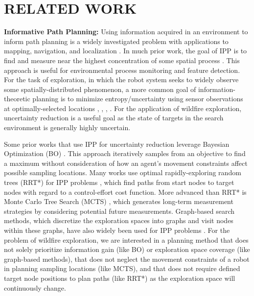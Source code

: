 \documentclass[letterpaper, 10 pt, conference]{ieeeconf}  %
\begin{document}
\section{RELATED WORK}
\noindent
\textbf{Informative Path Planning:}
Using information acquired in an environment to inform path planning is a widely investigated problem with applications to mapping, navigation, and localization \cite{bai2021information}. In much prior work, the goal of IPP is to find and measure near the highest concentration of some spatial process \cite{marchant2014sequential} \cite{blanchard2022informative} \cite{singh2009nonmyopic}. This approach is useful for environmental process monitoring and feature detection. 
For the task of exploration, in which the robot system seeks to widely observe some spatially-distributed phenomenon, a more common goal of information-theoretic planning is to minimize entropy/uncertainty using sensor observations at optimally-selected locations \cite{584097}, \cite{jiang2019maximum}, \cite{popovic2017online}, \cite{cao2013multi}. For the application of wildfire exploration, uncertainty reduction is a useful goal as the state of targets in the search environment is generally highly uncertain. 

Some prior works that use IPP for uncertainty reduction leverage Bayesian Optimization (BO) \cite{marchant2014sequential} \cite{bai2016information}. This approach iteratively samples from an objective to find a maximum without consideration of how an agent's movement constraints affect possible sampling locations. Many works use optimal rapidly-exploring random trees (RRT*) \cite{karaman2011sampling} for IPP problems \cite{schmid2020efficient} \cite{hollinger2013sampling}, which find paths from start nodes to target nodes with regard to a control-effort cost function. More advanced than RRT* is Monte Carlo Tree Search (MCTS) \cite{kodgule2019non} \cite{9196631}, which generates long-term measurement strategies by considering potential future measurements. Graph-based search methods, which discretize the exploration spaces into graphs and visit nodes within these graphs, have also widely been used for IPP problems \cite{binney2010informative} \cite{zhu2021online}. For the problem of wildfire exploration, we are interested in a planning method that does not solely prioritize information gain (like BO) or exploration space coverage (like graph-based methods), that does not neglect the movement constraints of a robot in planning sampling locations (like MCTS), and that does not require defined target node positions to plan paths (like RRT*) as the exploration space will continuously change.
\end{document}
